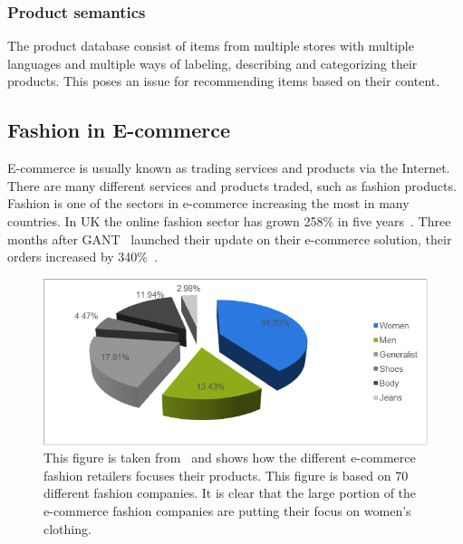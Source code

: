 \subsubsection{Product semantics}

The product database consist of items from multiple stores with multiple
languages and multiple ways of labeling, describing and categorizing their
products.  This poses an issue for recommending items based on their content.


\subsection{Fashion in E-commerce}
    \label{subsubs:fashionInEcom}
    E-commerce is usually known as trading services and products via the Internet. There are many different services and products traded, such as fashion products. Fashion is one of the sectors in e-commerce increasing the most in many countries. In UK the online fashion sector has grown 258\% in five years~\cite{Divante2014}. Three months after GANT~\cite{gant} launched their update on their e-commerce solution, their orders increased by 340\%~\cite{magentoGant}.

    \begin{figure}[H]
        \includegraphics[width=5in]{image/ecommerceFashionBenchmark.png}
        \centering
        \caption[E-commerce benchmark and Fashion]{This figure is taken from~\cite{Jorij2012} and shows how the different e-commerce fashion retailers focuses their products.
        This figure is based on 70 different fashion companies.
        It is clear that the large portion of the e-commerce fashion companies are putting their focus on women's clothing.}
    \end{figure}

